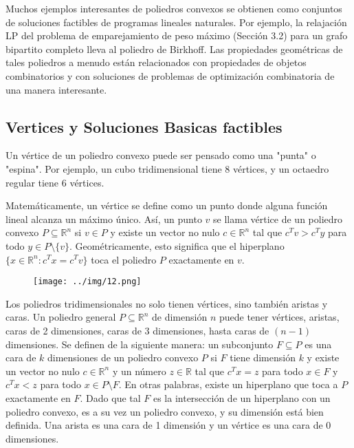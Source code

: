 \documentclass{article}
\begin{document}
Muchos ejemplos interesantes de poliedros convexos se obtienen como conjuntos de soluciones factibles de programas lineales naturales. Por ejemplo, la relajación LP del problema de emparejamiento de peso máximo (Sección 3.2) para un grafo bipartito completo lleva al poliedro de Birkhoff. Las propiedades geométricas de tales poliedros a menudo están relacionados con propiedades de objetos combinatorios y con soluciones de
problemas de optimización combinatoria de una manera interesante.

\newpage 
\subsection{Vertices y Soluciones Basicas factibles}

Un vértice de un poliedro convexo puede ser pensado como una "punta" o "espina". Por ejemplo, un cubo tridimensional tiene 8 vértices, y un octaedro regular tiene 6 vértices.

Matemáticamente, un vértice se define como un punto donde alguna función lineal alcanza un máximo único. Así, un punto \( v \) se llama vértice de un poliedro convexo \( P \subseteq \mathbb{R}^n \) si \( v \in P \) y existe un vector no nulo \( c \in \mathbb{R}^n \) tal que \( c^T v > c^T y \) para todo \( y \in P \setminus \{v\} \). Geométricamente, esto significa que el hiperplano \( \{ x \in \mathbb{R}^n : c^T x = c^T v \} \) toca el poliedro \( P \) exactamente en \( v \).


\begin{figure}[H] %
\centering %
\texttt{[image: ../img/12.png]} %
\label{fig:imagen} %
\end{figure}
Los poliedros tridimensionales no solo tienen vértices, sino también aristas y caras. Un poliedro general \( P \subseteq \mathbb{R}^n \) de dimensión \( n \) puede tener vértices, aristas, caras de 2 dimensiones, caras de 3 dimensiones, hasta caras de \( (n-1) \) dimensiones. Se definen de la siguiente manera: un subconjunto \( F \subseteq P \) es una cara de \( k \) dimensiones de un poliedro convexo \( P \) si \( F \) tiene dimensión \( k \) y existe un vector no nulo \( c \in \mathbb{R}^n \) y un número \( z \in \mathbb{R} \) tal que \( c^T x = z \) para todo \( x \in F \) y \( c^T x < z \) para todo \( x \in P \setminus F \). En otras palabras, existe un hiperplano que toca a \( P \) exactamente en \( F \). Dado que tal \( F \) es la intersección de un hiperplano con un poliedro convexo, es a su vez un poliedro convexo, y su dimensión está bien definida. Una arista es una cara de 1 dimensión y un vértice es una cara de 0 dimensiones.
\end{document}
